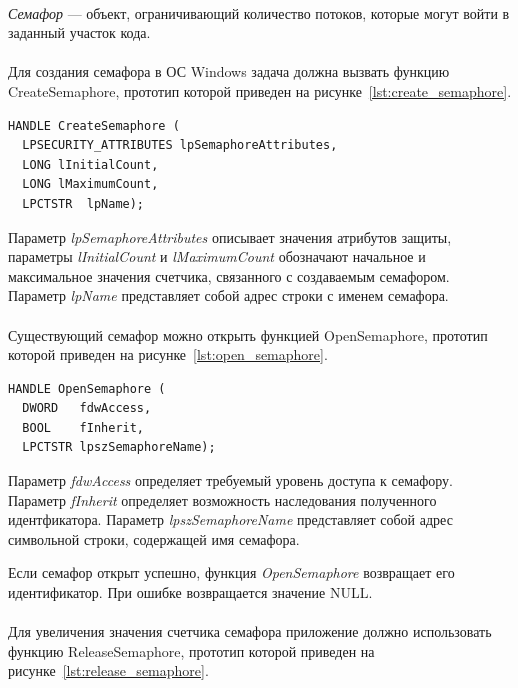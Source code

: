 \paragraph{}
\textit{Семафор} --- объект, ограничивающий количество потоков, 
которые могут войти в заданный участок кода. 

\paragraph{}
Для создания семафора в ОС Windows задача должна вызвать функцию CreateSemaphore,
прототип которой приведен на рисунке~\ref{lst:create_semaphore}.

\begin{lstlisting}[caption=Прототип функции создания семафора,
  label=lst:create_semaphore]
HANDLE CreateSemaphore (
  LPSECURITY_ATTRIBUTES lpSemaphoreAttributes,
  LONG lInitialCount, 
  LONG lMaximumCount, 
  LPCTSTR  lpName);
\end{lstlisting}

Параметр \textit{lpSemaphoreAttributes} описывает значения атрибутов защиты,
параметры \textit{lInitialCount} и \textit{lMaximumCount} обозначают начальное и 
максимальное значения счетчика, связанного с создаваемым семафором.
Параметр \textit{lpName} представляет собой адрес строки с именем семафора.

\paragraph{}
Существующий семафор можно открыть функцией OpenSemaphore, 
прототип которой приведен на рисунке~\ref{lst:open_semaphore}.

\begin{lstlisting}[caption=Прототип функции открытия семафора,
  label=lst:open_semaphore]
HANDLE OpenSemaphore (
  DWORD   fdwAccess,
  BOOL    fInherit, 
  LPCTSTR lpszSemaphoreName);
\end{lstlisting}

Параметр \textit{fdwAccess} определяет требуемый уровень доступа к семафору.
Параметр \textit{fInherit} определяет возможность наследования полученного идентфикатора.
Параметр \textit{lpszSemaphoreName} представляет собой адрес символьной строки,
содержащей имя семафора.

Если семафор открыт успешно, функция \textit{OpenSemaphore} возвращает его идентификатор.
При ошибке возвращается значение NULL.

\paragraph{}
Для увеличения значения счетчика семафора приложение должно использовать
функцию ReleaseSemaphore, прототип которой приведен на рисунке~\ref{lst:release_semaphore}.

